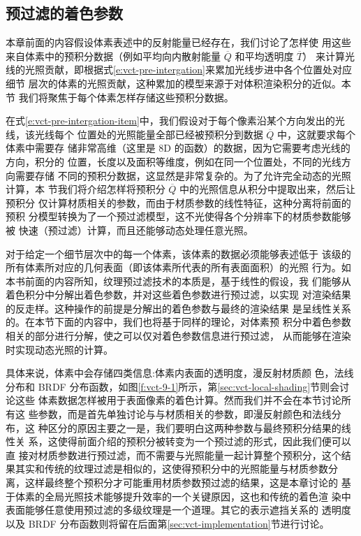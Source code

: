 



\subsection{预过滤的着色参数}
本章前面的内容假设体素表述中的反射能量已经存在，我们讨论了怎样使 用这些来自体素中的预积分数据（例如平均向内散射能量 $\overline{Q}$ 和平均透明度 $\overline{T}$） 来计算光线的光照贡献，即根据式\ref{e:vct-pre-intergation}来累加光线步进中各个位置处对应细节 层次的体素的光照贡献，这种累加的模型来源于对体积渲染积分的近似。本节 我们将聚焦于每个体素怎样存储这些预积分数据。

在式\ref{e:vct-pre-intergation-item}中，我们假设对于每个像素沿某个方向发出的光线，该光线每个 位置处的光照能量全部已经被预积分到数据 $\overline{Q}$ 中，这就要求每个体素中需要存 储非常高维（这里是 8D 的函数）的数据，因为它需要考虑光线的方向，积分的 位置，长度以及面积等维度，例如在同一个位置处，不同的光线方向需要存储 不同的预积分数据，这显然是非常复杂的。为了允许完全动态的光照计算，本 节我们将介绍怎样将预积分 $\overline{Q}$ 中的光照信息从积分中提取出来，然后让预积分 仅计算材质相关的参数，而由于材质参数的线性特征，这种分离将前面的预积 分模型转换为了一个预过滤模型，这不光使得各个分辨率下的材质参数能够被 快速（预过滤）计算，而且还能够动态处理任意光照。

对于给定一个细节层次中的每一个体素，该体素的数据必须能够表述低于 该级的所有体素所对应的几何表面（即该体素所代表的所有表面面积）的光照 行为。如本书前面的内容所知，纹理预过滤技术的本质是，基于线性的假设，我 们能够从着色积分中分解出着色参数，并对这些着色参数进行预过滤，以实现 对渲染结果的反走样。这种操作的前提是分解出的着色参数与最终的渲染结果 是呈线性关系的。在本节下面的内容中，我们也将基于同样的理论，对体素预 积分中着色参数相关的部分进行分解，使之可以仅对着色参数信息进行预过滤， 从而能够在渲染时实现动态光照的计算。

具体来说，体素中会存储四类信息:体素内表面的透明度，漫反射材质颜 色，法线分布和 BRDF 分布函数，如图\ref{f:vct-9-1}所示，第\ref{sec:vct-local-shading}节则会讨论这些 体素数据怎样被用于表面像素的着色计算。然而我们并不会在本节讨论所有这 些参数，而是首先单独讨论与与材质相关的参数，即漫反射颜色和法线分布，这 种区分的原因主要之一是，我们要明白这两种参数与最终预积分结果的线性关 系，这使得前面介绍的预积分被转变为一个预过滤的形式，因此我们便可以直 接对材质参数进行预过滤，而不需要与光照能量一起计算整个预积分，这个结 果其实和传统的纹理过滤是相似的，这使得预积分中的光照能量与材质参数分 离，这样最终整个预积分才可能重用材质参数预过滤的结果，这是本章讨论的 基于体素的全局光照技术能够提升效率的一个关键原因，这也和传统的着色渲 染中表面能够任意使用预过滤的多级纹理是一个道理。其它的表示遮挡关系的 透明度以及 BRDF 分布函数则将留在后面第\ref{sec:vct-implementation}节进行讨论。

